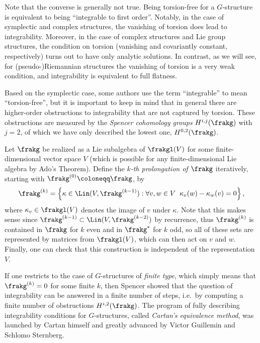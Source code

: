 \begin{rem}
    Note that the converse is generally not true. Being torsion-free for a $G$-structure is equivalent to being ``integrable to first order''. Notably, in the case of symplectic and complex structures, the vanishing of torsion does lead to integrability. Moreover, in the case of complex structures and Lie group structures, the condition on torsion (vanishing and covariantly constant, respectively) turns out to have only analytic solutions. In contrast, as we will see, for (pseudo-)Riemannian structures the vanishing of torsion is a very weak condition, and integrability is equivalent to full flatness. 
    
    Based on the symplectic case, some authors use the term ``integrable'' to mean ``torsion-free'', but it is important to keep in mind that in general there are higher-order obstructions to integrability that are not captured by torsion. These obstructions are measured by the \emph{Spencer cohomology groups} $H^{i,j}(\frakg)$ with $j=2$, of which we have only described the lowest one, $H^{0,2}(\frakg)$. 

    Let $\frakg$ be realized as a Lie subalgebra of $\frakgl(V)$ for some finite-dimensional vector space $V$ (which is possible for any finite-dimensional Lie algebra by Ado's Theorem). Define the \emph{$k$-th prolongation of $\frakg$} iteratively, starting with $\frakg^{(0)}\coloneqq \frakg$, by
    \[\frakg^{(k)}=\left\{\kappa \in\Lin(V,\frakg^{(k-1)}):\forall v,w\in V\;\; \kappa_v(w)-\kappa_w(v)=0\right\},\]
    where $\kappa_v\in\frakgl(V)$ denotes the image of $v$ under $\kappa$. Note that this makes sense since $\frakg^{(k-1)}\subset \Lin(V,\frakg^{(k-2)})$ by recurrence, thus $\frakg^{(k)}$ is contained in $\frakg$ for $k$ even and in $\frakg^\ast$ for $k$ odd, so all of these sets are represented by matrices from $\frakgl(V)$, which can then act on $v$ and $w$. Finally, one can check that this construction is independent of the representation $V$.
    
    If one restricts to the case of $G$-structures of \emph{finite type}, which simply means that $\frakg^{(k)}=0$ for some finite $k$, then Spencer showed that the question of integrability can be answered in a finite number of steps, i.e.\ by computing a finite number of obstructions $H^{i,2}(\frakg)$. The program of fully describing integrability conditions for $G$-structures, called \emph{Cartan's equivalence method}, was launched by Cartan himself and greatly advanced by Victor Guillemin and Schlomo Sternberg.
\end{rem}

